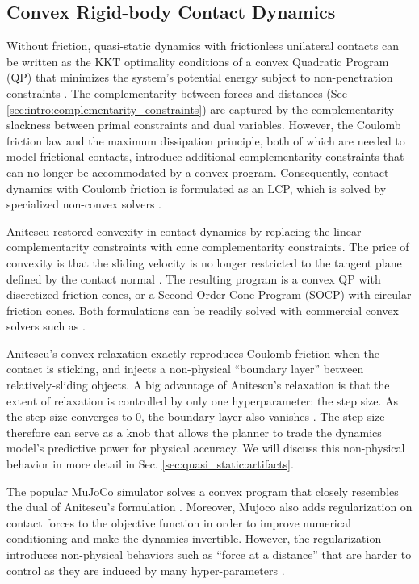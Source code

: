 \subsection{Convex Rigid-body Contact Dynamics} \label{sec:convex_contact_background}
Without friction, quasi-static dynamics with frictionless unilateral contacts can be written as the KKT optimality conditions of a convex Quadratic Program (QP) that minimizes the system's potential energy subject to non-penetration constraints \cite{pang2021convex}. The complementarity between forces and distances (Sec \ref{sec:intro:complementarity_constraints}) are captured by the complementarity slackness between primal constraints and dual variables. However, the Coulomb friction law and the maximum dissipation principle, both of which are needed to model frictional contacts, introduce additional complementarity constraints that can no longer be accommodated by a convex program. Consequently, contact dynamics with Coulomb friction is formulated as an LCP, which is solved by specialized non-convex solvers \cite{anitescu1997formulating, stewart2000rigid}.

Anitescu restored convexity in contact dynamics by replacing the linear complementarity constraints with cone complementarity constraints. The price of convexity is that the sliding velocity is no longer restricted to the tangent plane defined by the contact normal \cite{anitescu2006optimization, SiggraphContact22}. The resulting program is a convex QP with discretized friction cones, or a Second-Order Cone Program (SOCP) with circular friction cones. Both formulations can be readily solved with commercial convex solvers such as \cite{mosek}.

Anitescu's convex relaxation exactly reproduces Coulomb friction when the contact is sticking, and injects a non-physical ``boundary layer'' between relatively-sliding objects. A big advantage of Anitescu's relaxation is that the extent of relaxation is controlled by only one hyperparameter: the step size. As the step size converges to 0, the boundary layer also vanishes \cite{anitescu2006optimization}. The step size therefore can serve as a knob that allows the planner to trade the dynamics model's predictive power for physical accuracy. We will discuss this non-physical behavior in more detail in Sec. \ref{sec:quasi_static:artifacts}.

The popular MuJoCo simulator\cite{todorov2012mujoco, todorov2014convex} solves a convex program that closely resembles the dual of Anitescu's formulation \cite[Appendix B]{underactuated}. Moreover, Mujoco also adds regularization on contact forces to the objective function in order to improve numerical conditioning and make the dynamics invertible. However, the regularization introduces non-physical behaviors such as ``force at a distance'' that are harder to control as they are induced by many hyper-parameters \cite{kolbert2016experimental}. 

